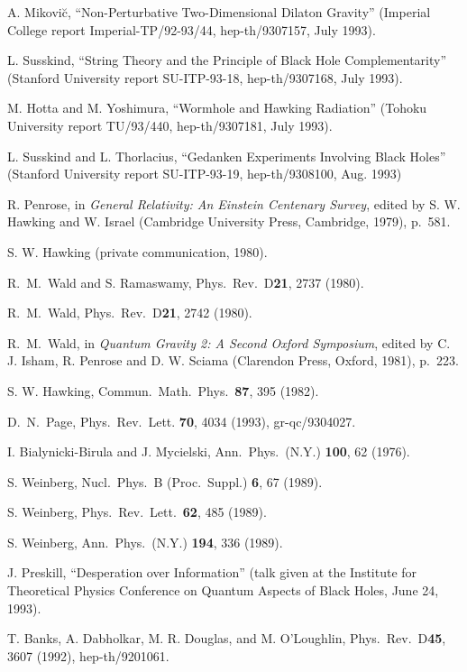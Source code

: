 \documentclass[12pt]{article}
\begin{document}
\begin{thebibliography}{999}
 A. Mikovi\u{c}, ``Non-Perturbative Two-Dimensional
Dilaton
Gravity'' (Imperial College report Imperial-TP/92-93/44,
hep-th/9307157,
July 1993).

 L. Susskind, ``String Theory and the Principle of Black
Hole
Complementarity'' (Stanford University report SU-ITP-93-18,
hep-th/9307168,
July 1993).

 M. Hotta and M. Yoshimura, ``Wormhole and Hawking
Radiation''
(Tohoku University report TU/93/440, hep-th/9307181, July 1993).

 L. Susskind and L. Thorlacius, ``Gedanken Experiments
Involving Black Holes'' (Stanford University report SU-ITP-93-19,
hep-th/9308100, Aug. 1993)

 R. Penrose, in {\em General Relativity:  An
Einstein Centenary Survey}, edited by  S. W. Hawking and
W. Israel (Cambridge University Press, Cambridge, 1979),
p.~581.

 S. W. Hawking (private communication, 1980).

 R.\ M.\ Wald and S. Ramaswamy,
Phys.\ Rev.\ D{\bf 21}, 2737 (1980).

 R.\ M.\ Wald, Phys.\ Rev.\ D{\bf 21}, 2742 (1980).

 R.\ M.\ Wald, in {\em Quantum Gravity 2:  A Second
Oxford
Symposium}, edited by C. J. Isham, R. Penrose and D. W. Sciama
(Clarendon
Press, Oxford, 1981), p.~223.

 S. W. Hawking, Commun.\ Math.\ Phys.\ {\bf 87}, 395
(1982).

 D.\ N.\ Page, Phys.\ Rev.\ Lett. {\bf 70}, 4034
(1993),
gr-qc/9304027.

 I. Bialynicki-Birula and J. Mycielski, Ann.\ Phys.\
(N.Y.)
{\bf 100}, 62 (1976).

 S. Weinberg, Nucl.\ Phys.\ B (Proc.\ Suppl.) {\bf 6}, 67
(1989).

 S. Weinberg, Phys.\  Rev.\ Lett.\ {\bf 62}, 485 (1989).

 S. Weinberg, Ann.\ Phys.\ (N.Y.) {\bf 194}, 336 (1989).

 J. Preskill, ``Desperation over Information'' (talk
given at
the
Institute for Theoretical Physics Conference on Quantum Aspects of
Black Holes,
June 24, 1993).

 T. Banks, A. Dabholkar, M. R. Douglas, and M.
O'Loughlin,
Phys.\ Rev.\ D{\bf45}, 3607 (1992), hep-th/9201061.


\end{thebibliography}
\end{document}
